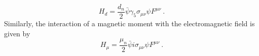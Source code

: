 \begin{equation}
\label{eqn:hamiltonianRELelectric}
H_d = \frac{d_n}{2} \bar{\psi} \gamma_5 \sigma_{\mu \nu} \psi F^{\mu \nu}~.
\end{equation}
Similarly, the interaction of a magnetic moment with the
electromagnetic field is given by
\begin{equation}
\label{eqn:hamiltonianRELmagnetic}
  H_\mu = \frac{\mu_n}{2} \bar{\psi} i \sigma_{\mu \nu} \psi F^{\mu \nu}~.
\end{equation}


